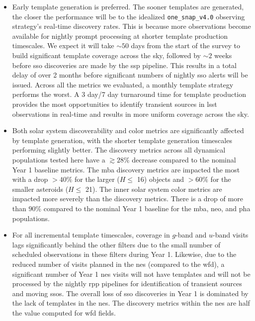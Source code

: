 \documentclass[preprintm,linenumbers]{aastex631}
\newcommand{\baseline}{\texttt{one\_snap\_v4.0}\xspace}
\begin{document}
		\begin{itemize}
			\item Early template generation is preferred. The sooner templates are generated, the closer the performance will be to the idealized \baseline observing strategy's real-time discovery rates. This is because more observations become available for nightly prompt processing at shorter template production timescales. 
       We expect it will take $\sim 50$ days from the start of the survey to build significant template coverage across the sky, followed by $\sim 2$ weeks before  \gls*{sso} discoveries are made by the \gls*{ssp} pipeline.
       This results in a total delay of over 2 months before significant numbers of nightly \gls*{sso} alerts will be issued.
			 Across all the metrics we evaluated, a monthly template strategy performs the worst. A 3 day/7 day turnaround time for template production provides the most opportunities to identify transient sources in \gls*{lsst} observations in real-time and results in more uniform coverage across the sky. 
   

			\item Both solar system discoverability and color metrics are significantly affected by template generation, with the shorter template generation timescales performing slightly better. 
			 The discovery metrics across all dynamical populations tested here have a $\gtrsim28\%$ decrease compared to the nominal Year 1 baseline metrics. The \gls*{mba} discovery metrics are impacted the most with a drop $>40\%$ for the larger ($H \leq$ 16) objects and $>60\%$ for the smaller asteroids ($H \leq$ 21). 
			 The inner solar system color metrics are impacted more severely than the discovery metrics. There is a drop of more than $90\%$ compared to the nominal Year 1 baseline for the \gls*{mba}, \gls*{neo}, and \gls*{pha} populations. 

			\item For all incremental template timescales, coverage in $g$-band and $u$-band visits lags significantly behind the other filters due to the small number of scheduled observations in these filters during Year 1. 
			 Likewise, due to the reduced number of visits planned in the \gls*{nes} (compared to the \gls*{wfd}), a significant number of Year 1 \gls*{nes} visits will not have templates and will not be processed by the nightly \gls*{rpp} pipelines for identification of transient sources and moving \glspl*{sso}.
                   The overall loss of \gls*{sso} discoveries in Year 1 is dominated by the lack of templates in the \gls*{nes}. The discovery metrics within the \gls*{nes} are half the value computed for \gls*{wfd} fields. 

                		\end{itemize}
\end{document}
